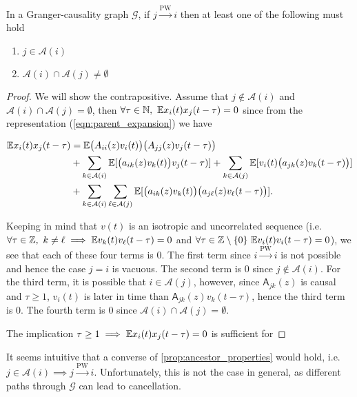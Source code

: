 \documentclass[12pt]{article}
\def\pwgc{\overset{\text{PW}}{\rightarrow}}  %
\def\gcg{\mathcal{G}}  %
\def\A{\mathsf{A}}  %
\newcommand{\anc}[1]{\mathcal{A}(#1)}  %
\begin{document}
\begin{proposition}
  \label{prop:ancestor_properties}
  In a Granger-causality graph $\gcg$, if $j \pwgc i$ then at least
  one of the following must hold

  \begin{enumerate}
    \item{$j \in \anc{i}$}
    \item{$\anc{i} \cap \anc{j} \ne \emptyset$}
  \end{enumerate}
\end{proposition}
\begin{proof}
  We will show the contrapositive.  Assume that $j \not \in \anc{i}$ and $\anc{i} \cap \anc{j} = \emptyset$, then $\forall \tau \in \mathbb{N},\ \mathbb{E} x_i(t)x_j(t - \tau) = 0$ since from the representation (\ref{eqn:parent_expansion}) we have

  \begin{align*}
    \E x_i(t)x_j(t - \tau) &= \E \big(A_{ii}(z)v_i(t)\big)\big(A_{jj}(z)v_j(t - \tau)\big)\\
    &+ \sum_{k \in \anc{i}}\E[\big(a_{ik}(z)v_k(t)\big)v_j(t - \tau)] + \sum_{k \in \anc{j}}\E[v_i(t) \big(a_{jk}(z) v_k(t - \tau)\big)]\\
    &+ \sum_{k \in \anc{i}}\sum_{\ell \in \anc{j}}\E[\big(a_{ik}(z)v_k(t)\big)\big(a_{j\ell}(z)v_\ell(t - \tau)\big)].
  \end{align*}

  Keeping in mind that $v(t)$ is an isotropic and uncorrelated sequence (i.e. $\forall \tau \in \mathbb{Z},\ k \ne \ell \implies \mathbb{E} v_k(t)v_\ell(t - \tau) = 0$ and $\forall \tau \in \mathbb{Z}\setminus\{0\}\ \mathbb{E} v_i(t)v_i(t - \tau) = 0$), we see that each of these four terms is 0.  The first term since $i \pwgc i$ is not possible and hence the case $j = i$ is vacuous.  The second term is 0 since $j \not\in \anc{i}$.  For the third term, it is possible that $i \in \anc{j}$, however, since $\A_{jk}(z)$ is causal and $\tau \ge 1$, $v_i(t)$ is later in time than $\A_{jk}(z)v_k(t - \tau)$, hence the third term is 0.  The fourth term is 0 since $\anc{i}\cap\anc{j} = \emptyset$.

The implication $\tau \ge 1 \implies \mathbb{E} x_i(t)x_j(t - \tau) = 0$ is sufficient for 

\end{proof}

It seems intuitive that a converse of \ref{prop:ancestor_properties}
would hold, i.e. $j \in \anc{i} \implies j \pwgc i$.  Unfortunately,
this is not the case in general, as different paths through $\gcg$ can
lead to cancellation.
\end{document}
